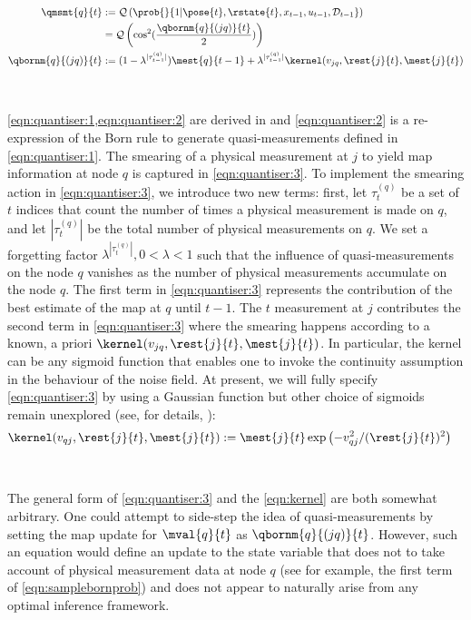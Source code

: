 \\
\\
\begin{align}
\qmsmt{q}{t} & :=\mathcal{Q}\left( \prob{}{1 | \pose{t}, \rstate{t}, x_{t-1}, u_{t-1}, \mathcal{D}_{t-1}}  \right) \label{eqn:quantiser:1}\\
& =\mathcal{Q}\left( \cos^2(\frac{\qbornm{q}{(jq)}{t}}{2}) \label{eqn:quantiser:2} \right) \\
\qbornm{q}{(jq)}{t} & :=  (1 - \lambda^{|\tau^{(q)}_{t-1}|})\mest{q}{t-1} + \lambda^{|\tau^{(q)}_{t-1}|}\kernel(v_{jq},\rest{j}{t}, \mest{j}{t}) \label{eqn:quantiser:3}
\end{align} 
\\
\\
\cref{eqn:quantiser:1,eqn:quantiser:2} are derived in \cite{riddhi_paper2} and \cref{eqn:quantiser:2} is a re-expression of the Born rule to generate quasi-measurements defined in \cref{eqn:quantiser:1}. The smearing of a physical measurement at $j$ to yield map information at node $q$ is captured in \cref{eqn:quantiser:3}. To implement the smearing action in \cref{eqn:quantiser:3}, we introduce two new terms: first, let $\tau^{(q)}_t$ be a set of $t$ indices that count the number of times a physical measurement is made on $q$, and let $|\tau^{(q)}_t|$ be the total number of physical measurements on $q$. We set a forgetting factor $\lambda^{|\tau^{(q)}_t|}, 0 < \lambda < 1$ such that the influence of quasi-measurements on the node $q$ vanishes as the number of physical measurements accumulate on the node $q$. The first term in \cref{eqn:quantiser:3} represents the contribution of the best estimate of the map at $q$ until $t-1$. The $t$ measurement at $j$ contributes the second term in \cref{eqn:quantiser:3} where the smearing happens according to a known, a priori $\kernel(v_{jq},\rest{j}{t}, \mest{j}{t})$. In particular,  the kernel can be any sigmoid function that enables one to invoke the continuity assumption in the behaviour of the noise field. At present, we will fully specify \cref{eqn:quantiser:3} by using  a Gaussian function but other choice of sigmoids remain unexplored (see, for details, \cite{ito1992approximation}):
\begin{align}
\kernel(v_{qj},\rest{j}{t}, \mest{j}{t}) &:= \mest{j}{t}\exp\left(-v_{qj}^2 / (\rest{j}{t})^2 \right)  \label{eqn:kernel}
\end{align} \\
\\ The general form of \cref{eqn:quantiser:3} and the \cref{eqn:kernel} are both somewhat arbitrary. One could attempt to side-step the idea of quasi-measurements by setting the map update for $\mval{q}{t}$ as $\qbornm{q}{(jq)}{t}$. However, such an equation would define an update to the state variable that does not to take account of physical measurement data at node $q$ (see for example, the first term of \cref{eqn:samplebornprob}) and does not appear to naturally arise from any optimal inference framework. \\
